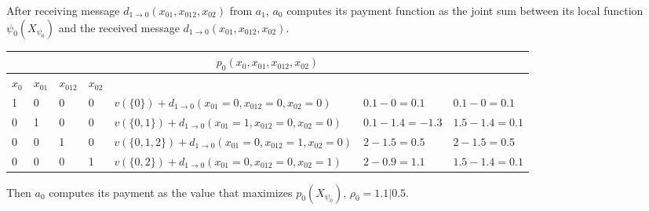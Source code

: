\documentclass{article}
\begin{document}
\vspace{0.1in}\noindent After receiving message $d_{1\rightarrow
0}(x_{01},x_{012},x_{02})$ from $a_1$, $a_0$ computes its payment function as
the joint sum between its local function $\psi_0(X_{\psi_0})$ and the received message
$d_{1\rightarrow 0}(x_{01},x_{012},x_{02})$.


\noindent\begin{tabular}{ | l | l |  l | l | l |l | l | }
\multicolumn{7}{c}{$p_0(x_{0},x_{01},x_{012},x_{02})$}  \\
\hline
	$x_{0}$ &	$x_{01}$ & $x_{012}$ & $x_{02}$ &  & &\\
\hline
	1&0	 &  0	& 0  & $v(\{0\})+ d_{1\rightarrow 0}(x_{01}=0,x_{012}=0,x_{02}=0)$
	&$0.1-0=0.1$ & $0.1-0=0.1$ \\ 
	0&1	 &	0 	& 0  & $v(\{0,1\})+ d_{1\rightarrow
	0}(x_{01}=1,x_{012}=0,x_{02}=0)$ & $0.1-1.4=-1.3$ &$1.5-1.4=0.1$  \\ 
	0&0	 &	1	& 0	& $v(\{0,1,2\})+ d_{1\rightarrow 0}(x_{01}=0,x_{012}=1,x_{02}=0)$&
	$2-1.5=0.5$&$2-1.5=0.5$\\ 
	0&0	 &	0	& 1	& $v(\{0,2\})+ d_{1\rightarrow 0}(x_{01}=0,x_{012}=0,x_{02}=1)$ &
	$2-0.9=1.1$ & $1.5-1.4=0.1$\\
\hline
\end{tabular}


\vspace{0.1in}\noindent Then $a_0$ computes its payment as the value that
maximizes $p_0(X_{\psi_0})$, $\rho_0 = 1.1\vert 0.5$.
\end{document}

